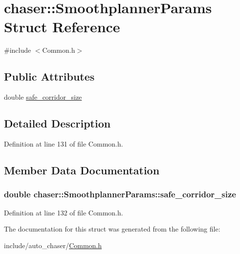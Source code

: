 \hypertarget{structchaser_1_1_smoothplanner_params}{}\section{chaser\+:\+:Smoothplanner\+Params Struct Reference}
\label{structchaser_1_1_smoothplanner_params}


{\ttfamily \#include $<$Common.\+h$>$}

\subsection*{Public Attributes}
\begin{DoxyCompactItemize}
\item 
double \hyperlink{structchaser_1_1_smoothplanner_params_a9f04e119fe2f90c33a0bd94702b5950a}{safe\+\_\+corridor\+\_\+size}
\end{DoxyCompactItemize}


\subsection{Detailed Description}


Definition at line 131 of file Common.\+h.



\subsection{Member Data Documentation}
\subsubsection[{\texorpdfstring{safe\+\_\+corridor\+\_\+size}{safe_corridor_size}}]{\setlength{\rightskip}{0pt plus 5cm}double chaser\+::\+Smoothplanner\+Params\+::safe\+\_\+corridor\+\_\+size}\hypertarget{structchaser_1_1_smoothplanner_params_a9f04e119fe2f90c33a0bd94702b5950a}{}\label{structchaser_1_1_smoothplanner_params_a9f04e119fe2f90c33a0bd94702b5950a}


Definition at line 132 of file Common.\+h.



The documentation for this struct was generated from the following file\+:\begin{DoxyCompactItemize}
\item 
include/auto\+\_\+chaser/\hyperlink{_common_8h}{Common.\+h}\end{DoxyCompactItemize}
